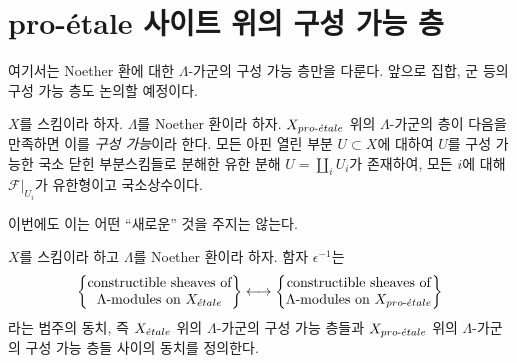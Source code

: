 \section{pro-\'etale 사이트 위의 구성 가능 층}
\label{section-constructible}

\noindent
여기서는 Noether 환에 대한 $\Lambda$-가군의 구성 가능 층만을
다룬다. 앞으로 집합, 군 등의 구성 가능 층도 논의할 예정이다.

\begin{definition}
\label{definition-constructible}
$X$를 스킴이라 하자. $\Lambda$를 Noether 환이라 하자.
$X_{pro\text{-}\acute{e}tale}$ 위의 $\Lambda$-가군의 층이 다음을 만족하면 이를
{\it 구성 가능}이라 한다. 모든 아핀 열린 부분
$U \subset X$에 대하여 $U$를 구성 가능한 국소 닫힌 부분스킴들로
분해한 유한 분해 $U = \coprod_i U_i$가 존재하여, 모든 $i$에 대해
$\mathcal{F}|_{U_i}$가 유한형이고 국소상수이다.
\end{definition}

\noindent
이번에도 이는 어떤 ``새로운'' 것을 주지는 않는다.

\begin{lemma}
\label{lemma-compare-constructible}
$X$를 스킴이라 하고 $\Lambda$를 Noether 환이라 하자. 함자
$\epsilon^{-1}$는
$$
\left\{
\begin{matrix}
\text{constructible sheaves of}\\
\Lambda\text{-modules on }X_{\acute{e}tale}\\
\end{matrix}
\right\}
\longleftrightarrow
\left\{
\begin{matrix}
\text{constructible sheaves of}\\
\Lambda\text{-modules on }X_{pro\text{-}\acute{e}tale}\\
\end{matrix}
\right\}
$$
라는 범주의 동치, 즉 $X_{\acute{e}tale}$ 위의 $\Lambda$-가군의 구성 가능
층들과 $X_{pro\text{-}\acute{e}tale}$ 위의 $\Lambda$-가군의 구성 가능 층들 사이의
동치를 정의한다.
\end{lemma}

